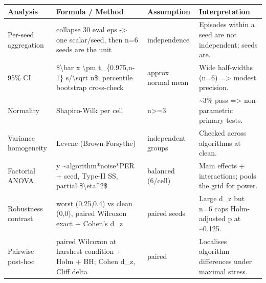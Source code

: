 \begin{tabular}{llll}
\toprule
Analysis & Formula / Method & Assumption & Interpretation \\
\midrule
Per-seed aggregation & collapse 30 eval eps -> one scalar/seed, then n=6 seeds are the unit & independence & Episodes within a seed are not independent; seeds are. \\
95\% CI & \$\textbackslash bar x \textbackslash pm t\_\{0.975,n-1\} s/\textbackslash sqrt n\$; percentile bootstrap cross-check & approx normal mean & Wide half-widths (n=6) => modest precision. \\
Normality & Shapiro-Wilk per cell & n>=3 & \textasciitilde 3\% pass => non-parametric primary tests. \\
Variance homogeneity & Levene (Brown-Forsythe) & independent groups & Checked across algorithms at clean. \\
Factorial ANOVA & y \textasciitilde \space algorithm*noise*PER + seed, Type-II SS, partial \$\textbackslash eta\textasciicircum 2\$ & balanced (6/cell) & Main effects + interactions; pools the grid for power. \\
Robustness contrast & worst (0.25,0.4) vs clean (0,0), paired Wilcoxon exact + Cohen's d\_z & paired seeds & Large d\_z but n=6 caps Holm-adjusted p at \textasciitilde 0.125. \\
Pairwise post-hoc & paired Wilcoxon at harshest condition + Holm + BH; Cohen d\_z, Cliff delta & paired & Localises algorithm differences under maximal stress. \\
\bottomrule
\end{tabular}
